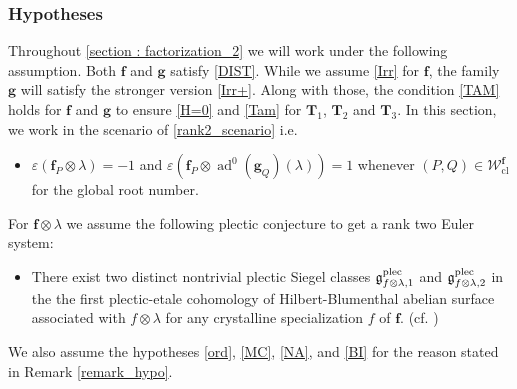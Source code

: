 \documentclass[10pt]{amsart}
\makeatletter
\numberwithin{equation}{section}
\newcommand{\mylabel}[2]{#2\def\@currentlabel{#2}\label{#1}}
\theoremstyle{definition}
\theoremstyle{remark} %
\newcommand{\mrm}{\mathrm}
\newcommand{\ad}{\operatorname{ad}}
\newcommand{\f}{\mathbf{f}}
\newcommand{\g}{\mathbf{g}}
\newcommand{\T}{\mathbf{T}}
\newcommand{\W}{\mathcal{W}}
\makeatother
\begin{document}
		\subsubsection{Hypotheses}
		Throughout \cref{section : factorization_2} we will work under the following assumption. Both $ \f $ and $ \g $ satisfy \ref{DIST}. While we assume \ref{Irr} for $ \f $, the family $ \g $ will satisfy the stronger version \ref{Irr+}. Along with those, the condition \ref{TAM} holds for $ \f $ and $ \g $ to ensure \ref{H=0} and \ref{Tam} for $ \T_{1} $, $ \T_{2} $ and $ \T_{3} $. In this section, we work in the scenario of \cref{rank2_scenario} i.e. 
		\begin{itemize}
			\item[\mylabel{sign2}{\textbf{(S2)}}] $ \varepsilon(\f_P \otimes \lambda) = -1 $ and  $ \varepsilon(\f_P \otimes \ad^0(\g_Q)(\lambda) )= 
			1$ whenever $(P,Q) \in \W_{\mrm{cl}}^{\f}	$ for the global root number.
		\end{itemize}
		For $ \f \otimes \lambda $ we assume the following plectic conjecture to get a rank two Euler system:
		\begin{itemize}
			\item[\mylabel{plectic}{\textbf{(Plec)}}] There exist two distinct nontrivial plectic Siegel classes $ \frak{g}_{f\otimes \lambda,1}^{\rm plec } $ and $ \frak{g}_{f\otimes \lambda,2}^{\rm plec } $ in the the first plectic-etale cohomology of Hilbert-Blumenthal abelian surface associated with $ f \otimes \lambda $ for any crystalline specialization $ f $ of $ \f $. (cf. \cite[]{nekovar16plectic})
		\end{itemize}
		We also assume the hypotheses \ref{ord}, \ref{MC}, \ref{NA}, and \ref{BI} for the reason stated in Remark \ref{remark_hypo}.
\end{document}
